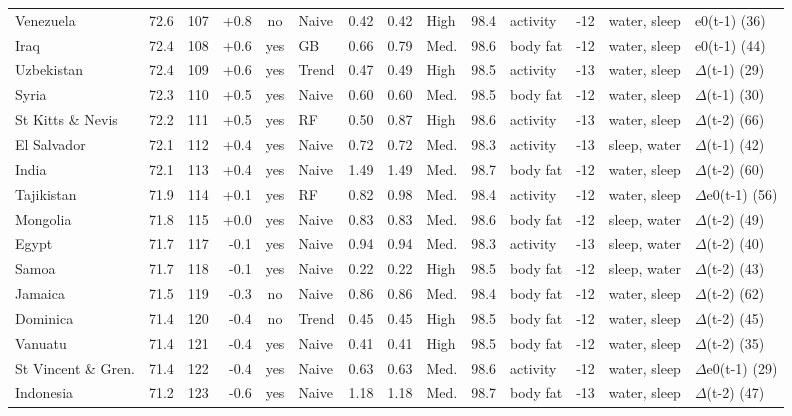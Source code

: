 {\begin{longtable}{l r r r c l r r l r l r l l}
Venezuela & 72.6 & 107 & +0.8 & no & Naive & 0.42 & 0.42 & High & 98.4 & activity & -12 & water, sleep & e0(t-1) (36) \\
Iraq & 72.4 & 108 & +0.6 & yes & GB & 0.66 & 0.79 & Med. & 98.6 & body fat & -12 & water, sleep & e0(t-1) (44) \\
Uzbekistan & 72.4 & 109 & +0.6 & yes & Trend & 0.47 & 0.49 & High & 98.5 & activity & -13 & water, sleep & $\Delta$(t-1) (29) \\
Syria & 72.3 & 110 & +0.5 & yes & Naive & 0.60 & 0.60 & Med. & 98.5 & body fat & -12 & water, sleep & $\Delta$(t-1) (30) \\
St Kitts \& Nevis & 72.2 & 111 & +0.5 & yes & RF & 0.50 & 0.87 & High & 98.6 & activity & -13 & water, sleep & $\Delta$(t-2) (66) \\
El Salvador & 72.1 & 112 & +0.4 & yes & Naive & 0.72 & 0.72 & Med. & 98.3 & activity & -13 & sleep, water & $\Delta$(t-1) (42) \\
India & 72.1 & 113 & +0.4 & yes & Naive & 1.49 & 1.49 & Med. & 98.7 & body fat & -12 & water, sleep & $\Delta$(t-2) (60) \\
Tajikistan & 71.9 & 114 & +0.1 & yes & RF & 0.82 & 0.98 & Med. & 98.4 & activity & -12 & water, sleep & $\Delta$e0(t-1) (56) \\
Mongolia & 71.8 & 115 & +0.0 & yes & Naive & 0.83 & 0.83 & Med. & 98.6 & body fat & -12 & sleep, water & $\Delta$(t-2) (49) \\
Egypt & 71.7 & 117 & -0.1 & yes & Naive & 0.94 & 0.94 & Med. & 98.3 & activity & -13 & sleep, water & $\Delta$(t-2) (40) \\
Samoa & 71.7 & 118 & -0.1 & yes & Naive & 0.22 & 0.22 & High & 98.5 & body fat & -12 & sleep, water & $\Delta$(t-2) (43) \\
Jamaica & 71.5 & 119 & -0.3 & no & Naive & 0.86 & 0.86 & Med. & 98.4 & body fat & -12 & water, sleep & $\Delta$(t-2) (62) \\
Dominica & 71.4 & 120 & -0.4 & no & Trend & 0.45 & 0.45 & High & 98.5 & body fat & -12 & water, sleep & $\Delta$(t-2) (45) \\
Vanuatu & 71.4 & 121 & -0.4 & yes & Naive & 0.41 & 0.41 & High & 98.5 & body fat & -12 & water, sleep & $\Delta$(t-2) (35) \\
St Vincent \& Gren. & 71.4 & 122 & -0.4 & yes & Naive & 0.63 & 0.63 & Med. & 98.6 & activity & -12 & water, sleep & $\Delta$e0(t-1) (29) \\
Indonesia & 71.2 & 123 & -0.6 & yes & Naive & 1.18 & 1.18 & Med. & 98.7 & body fat & -13 & water, sleep & $\Delta$(t-2) (47) \\

\end{longtable}}
